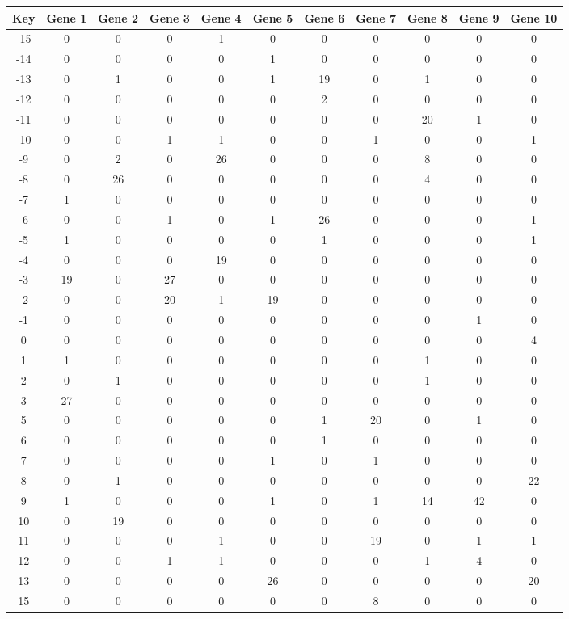 \begin{tabular}{|c|c|c|c|c|c|c|c|c|c|c|}
\hline
Key & Gene 1 & Gene 2 & Gene 3 & Gene 4 & Gene 5 & Gene 6 & Gene 7 & Gene 8 & Gene 9 & Gene 10 \\
\hline
-15 & 0 & 0 & 0 & 1 & 0 & 0 & 0 & 0 & 0 & 0 \\
-14 & 0 & 0 & 0 & 0 & 1 & 0 & 0 & 0 & 0 & 0 \\
-13 & 0 & 1 & 0 & 0 & 1 & 19 & 0 & 1 & 0 & 0 \\
-12 & 0 & 0 & 0 & 0 & 0 & 2 & 0 & 0 & 0 & 0 \\
-11 & 0 & 0 & 0 & 0 & 0 & 0 & 0 & 20 & 1 & 0 \\
-10 & 0 & 0 & 1 & 1 & 0 & 0 & 1 & 0 & 0 & 1 \\
-9 & 0 & 2 & 0 & 26 & 0 & 0 & 0 & 8 & 0 & 0 \\
-8 & 0 & 26 & 0 & 0 & 0 & 0 & 0 & 4 & 0 & 0 \\
-7 & 1 & 0 & 0 & 0 & 0 & 0 & 0 & 0 & 0 & 0 \\
-6 & 0 & 0 & 1 & 0 & 1 & 26 & 0 & 0 & 0 & 1 \\
-5 & 1 & 0 & 0 & 0 & 0 & 1 & 0 & 0 & 0 & 1 \\
-4 & 0 & 0 & 0 & 19 & 0 & 0 & 0 & 0 & 0 & 0 \\
-3 & 19 & 0 & 27 & 0 & 0 & 0 & 0 & 0 & 0 & 0 \\
-2 & 0 & 0 & 20 & 1 & 19 & 0 & 0 & 0 & 0 & 0 \\
-1 & 0 & 0 & 0 & 0 & 0 & 0 & 0 & 0 & 1 & 0 \\
0 & 0 & 0 & 0 & 0 & 0 & 0 & 0 & 0 & 0 & 4 \\
1 & 1 & 0 & 0 & 0 & 0 & 0 & 0 & 1 & 0 & 0 \\
2 & 0 & 1 & 0 & 0 & 0 & 0 & 0 & 1 & 0 & 0 \\
3 & 27 & 0 & 0 & 0 & 0 & 0 & 0 & 0 & 0 & 0 \\
5 & 0 & 0 & 0 & 0 & 0 & 1 & 20 & 0 & 1 & 0 \\
6 & 0 & 0 & 0 & 0 & 0 & 1 & 0 & 0 & 0 & 0 \\
7 & 0 & 0 & 0 & 0 & 1 & 0 & 1 & 0 & 0 & 0 \\
8 & 0 & 1 & 0 & 0 & 0 & 0 & 0 & 0 & 0 & 22 \\
9 & 1 & 0 & 0 & 0 & 1 & 0 & 1 & 14 & 42 & 0 \\
10 & 0 & 19 & 0 & 0 & 0 & 0 & 0 & 0 & 0 & 0 \\
11 & 0 & 0 & 0 & 1 & 0 & 0 & 19 & 0 & 1 & 1 \\
12 & 0 & 0 & 1 & 1 & 0 & 0 & 0 & 1 & 4 & 0 \\
13 & 0 & 0 & 0 & 0 & 26 & 0 & 0 & 0 & 0 & 20 \\
15 & 0 & 0 & 0 & 0 & 0 & 0 & 8 & 0 & 0 & 0 \\
\hline
\end{tabular}